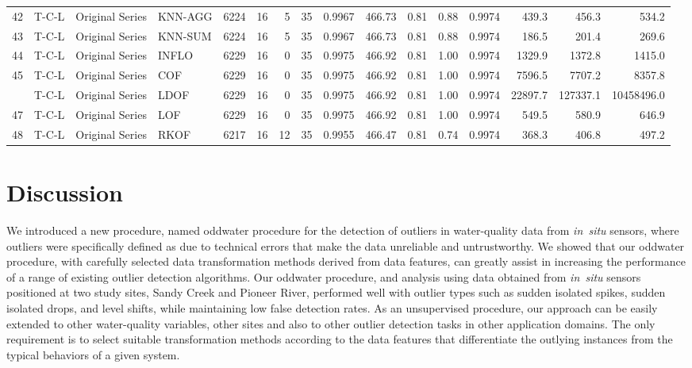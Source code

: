 \documentclass[draft]{agujournal2018} %
\begin{document}
\begin{table}[!htbp]
{\begin{tabular}{rlllrrrrrrrrrrrr}
42 & T-C-L & Original Series & KNN-AGG & 6224 & 16 & 5 & 35 & 0.9967 & 466.73 & 0.81 & 0.88 & 0.9974 & 439.3 & 456.3 & 534.2\\
43 & T-C-L & Original Series & KNN-SUM & 6224 & 16 & 5 & 35 & 0.9967 & 466.73 & 0.81 & 0.88 & 0.9974 & 186.5 & 201.4 & 269.6\\
44 & T-C-L & Original Series & INFLO & 6229 & 16 & 0 & 35 & 0.9975 & 466.92 & 0.81 & 1.00 & 0.9974 & 1329.9 & 1372.8 & 1415.0\\
45 & T-C-L & Original Series & COF & 6229 & 16 & 0 & 35 & 0.9975 & 466.92 & 0.81 & 1.00 & 0.9974 & 7596.5 & 7707.2 & 8357.8\\
\addlinespace
46 & T-C-L & Original Series & LDOF & 6229 & 16 & 0 & 35 & 0.9975 & 466.92 & 0.81 & 1.00 & 0.9974 & 22897.7 & 127337.1 & 10458496.0\\
47 & T-C-L & Original Series & LOF & 6229 & 16 & 0 & 35 & 0.9975 & 466.92 & 0.81 & 1.00 & 0.9974 & 549.5 & 580.9 & 646.9\\
48 & T-C-L & Original Series & RKOF & 6217 & 16 & 12 & 35 & 0.9955 & 466.47 & 0.81 & 0.74 & 0.9974 & 368.3 & 406.8 & 497.2\\
\bottomrule
\end{tabular}}
\end{table}

\section{Discussion}\label{sec:discussion}

We introduced a new \color{black} procedure, named oddwater procedure \color{black} for the detection of outliers in
water-quality data from \emph{in~situ} sensors, where outliers were
specifically defined as due to technical errors that make the data
unreliable and untrustworthy. We showed that our \color{black} oddwater procedure, \color{black}
with carefully selected data transformation methods derived from data
features, can greatly assist in increasing the performance of a range of
existing outlier detection algorithms. Our \color{black} oddwater procedure, \color{black} and analysis using
data obtained from \emph{in~situ} sensors positioned at two study sites,
Sandy Creek and Pioneer River, performed well with outlier types such as
sudden isolated spikes, sudden isolated drops, and level shifts, while
maintaining low false detection rates. As an unsupervised \color{black} procedure, \color{black} our
approach can be easily extended to other water-quality variables, other
sites and also to other outlier detection tasks in other application
domains. The only requirement is to select suitable transformation
methods according to the data features that differentiate the outlying
instances from the typical behaviors of a given system.
\end{document}
